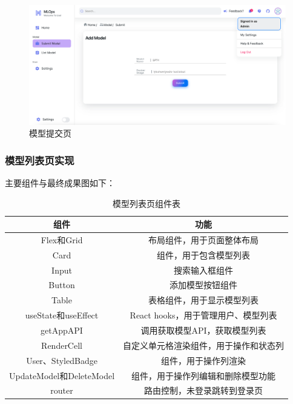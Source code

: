 \documentclass{HDU-Bachelor-Thesis}
\begin{document}
\begin{figure}[H] %
\centering %
\includegraphics[width=1\textwidth]{P-5.png} %
\caption{模型提交页} %
\label{图片.submit} %
\end{figure}

\subsubsection{模型列表页实现}

主要组件与最终成果图如下：

\begin{table}[htbp]
\caption{模型列表页组件表}  
\label{table:list}
\centering
\begin{tabular}{c|c}
\hline
\textbf{组件} & \textbf{功能}\\ 
\hline
Flex和Grid & 布局组件，用于页面整体布局\\
\hline
Card & 组件，用于包含模型列表\\
\hline
Input & 搜索输入框组件\\
\hline 
Button & 添加模型按钮组件\\
\hline
Table & 表格组件，用于显示模型列表\\ 
\hline
useState和useEffect & React hooks，用于管理用户、模型列表\\
\hline
getAppAPI & 调用获取模型API，获取模型列表\\
\hline
RenderCell & 自定义单元格渲染组件，用于操作和状态列\\
\hline
User、StyledBadge & 组件，用于操作列渲染\\
\hline
UpdateModel和DeleteModel & 组件，用于操作列编辑和删除模型功能\\
\hline
router & 路由控制，未登录跳转到登录页\\
\hline
\end{tabular}
\end{table}
\end{document}
